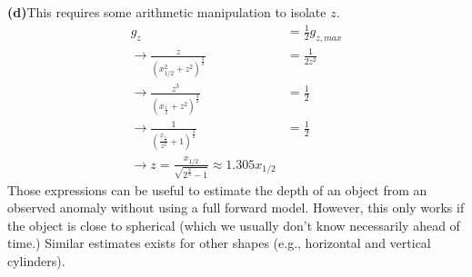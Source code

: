 \begin{tcolorbox}[enhanced jigsaw,breakable,pad at break*=1mm,
    colback=blue!5!white,colframe=babyblueeyes,title=Solutions]
    \textbf{(d)}This requires some arithmetic manipulation to isolate $z$.
\begin{eqnarray*}
g_z &=\frac{1}{2}g_{z,max} \\
\rightarrow \frac{z}{(x^2_{1/2}+z^2)^\frac{3}{2}} &= \frac{1}{2z^2}\\
\rightarrow \frac{z^3}{(x_{\frac{1}{2}}+z^2)^\frac{3}{2}}&= \frac{1}{2}\\
\rightarrow \frac{1}{(\frac{x_{\frac{1}{2}}}{z^2}+1)^\frac{3}{2}}&= \frac{1}{2}\\
\rightarrow z = \frac{x_{1/2}}{\sqrt{2^{\frac{2}{3}}-1}}\approx 1.305 x_{1/2}
\end{eqnarray*}
Those expressions can be useful to estimate the depth of an object from an observed anomaly without using a full forward model. However, this only works if the object is close to spherical (which we usually don't know necessarily ahead of time.) Similar estimates exists for other shapes (e.g., horizontal and vertical cylinders).
\end{tcolorbox}
\fi